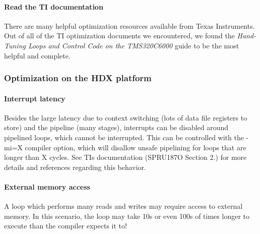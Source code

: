 \hypertarget{a00362_subsubsection__read_the_ti_documentation_}{}\paragraph{Read the T\+I documentation}\label{a00362_subsubsection__read_the_ti_documentation_}
 There are many helpful optimization resources available from Texas Instruments. Out of all of the T\+I optimization documents we encountered, we found the {\itshape Hand-\/\+Tuning Loops and Control Code on the T\+M\+S320\+C6000} guide to be the most helpful and complete.

\hypertarget{a00362_subsection__optimization_on_the_hdx_platform}{}\subsubsection{Optimization on the H\+D\+X platform}\label{a00362_subsection__optimization_on_the_hdx_platform}
 \hypertarget{a00362_subsubsection__interrupt_latency_}{}\paragraph{Interrupt latency}\label{a00362_subsubsection__interrupt_latency_}
 Besides the large latency due to context switching (lots of data file registers to store) and the pipeline (many stages), interrupts can be disabled around pipelined loops, which cannot be interrupted. This can be controlled with the -\/mi=X compiler option, which will disallow unsafe pipelining for loops that are longer than X cycles. See T\+I\textquotesingle{}s documentation (S\+P\+R\+U187\+O Section 2.) for more details and references regarding this behavior.

\hypertarget{a00362_subsubsection__external_memory_access_}{}\paragraph{External memory access}\label{a00362_subsubsection__external_memory_access_}
 A loop which performs many reads and writes may require access to external memory. In this scenario, the loop may take 10\textquotesingle{}s or even 100\textquotesingle{}s of times longer to execute than the compiler expects it to!

